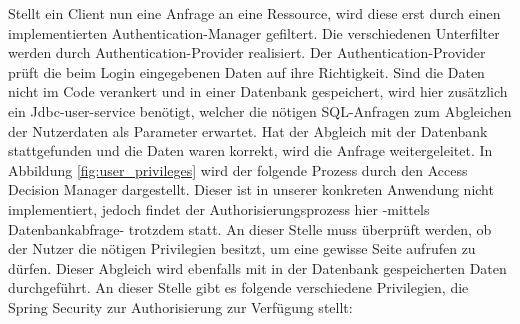 Stellt ein Client nun eine Anfrage an eine Ressource, wird diese erst durch einen implementierten 
Authentication-Manager gefiltert. Die verschiedenen Unterfilter werden durch Authentication-Provider 
realisiert. Der Authentication-Provider prüft die beim Login eingegebenen Daten auf ihre Richtigkeit. 
Sind die Daten nicht im Code verankert und in einer Datenbank gespeichert, wird hier zusätzlich ein 
Jdbc-user-service benötigt, welcher die nötigen SQL-Anfragen zum Abgleichen der Nutzerdaten als 
Parameter erwartet. Hat der Abgleich mit der Datenbank stattgefunden und die Daten waren korrekt, wird 
die Anfrage weitergeleitet. In Abbildung \ref{fig:user_privileges} wird der folgende Prozess durch den Access Decision 
Manager dargestellt. Dieser ist in unserer konkreten Anwendung nicht implementiert, jedoch findet der 
Authorisierungsprozess hier -mittels Datenbankabfrage- trotzdem statt. An dieser Stelle muss überprüft werden, ob der Nutzer die 
nötigen Privilegien besitzt, um eine gewisse Seite aufrufen zu dürfen. Dieser Abgleich wird ebenfalls 
mit in der Datenbank gespeicherten Daten durchgeführt. An dieser Stelle gibt es folgende verschiedene 
Privilegien, die Spring Security zur Authorisierung zur Verfügung stellt: \newpage

